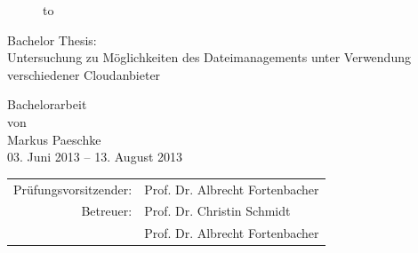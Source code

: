 \begin{titlepage}
\begin{figure}
  \begin{center}
    \hbox to 
  \end{center}
\end{figure}

\begin{center}
\rule{0pt}{0pt}
\vfill
\vfill
\vfill
\vfill

\begin{huge}
Bachelor Thesis:\\[0.75ex]
Untersuchung zu Möglichkeiten des Dateimanagements unter Verwendung verschiedener Cloudanbieter\\[0.75ex]
\end{huge}

\vfill
\vfill

Bachelorarbeit\\ von\\

\vspace*{.5cm}
Markus Paeschke\\
\vspace{.5cm}
03. Juni 2013 -- 13. August 2013 \\

\vfill
\vfill
\vfill
\vfill

\begin{tabular}{rl}
Prüfungsvorsitzender: & Prof. Dr. Albrecht Fortenbacher\\

Betreuer: & Prof. Dr. Christin Schmidt\\
& Prof. Dr. Albrecht Fortenbacher
\end{tabular}
\end{center}
\end{titlepage}
